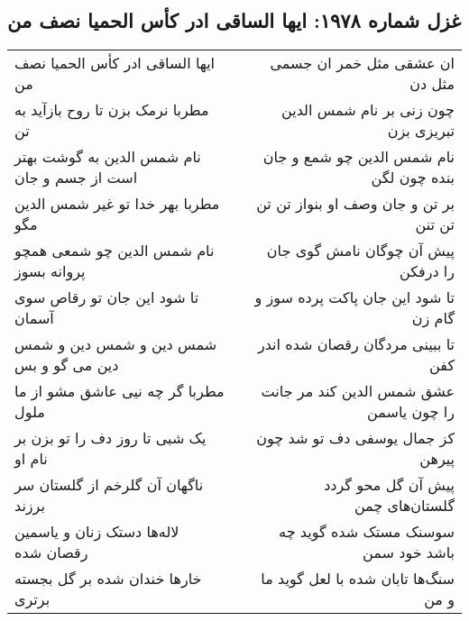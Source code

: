 \begin{center}
\section*{غزل شماره ۱۹۷۸: ایها الساقی ادر کأس الحمیا نصف من}
\label{sec:1978}
\begin{longtable}{l p{0.5cm} r}
ایها الساقی ادر کأس الحمیا نصف من
&&
ان عشقی مثل خمر ان جسمی مثل دن
\\
مطربا نرمک بزن تا روح بازآید به تن
&&
چون زنی بر نام شمس الدین تبریزی بزن
\\
نام شمس الدین به گوشت بهتر است از جسم و جان
&&
نام شمس الدین چو شمع و جان بنده چون لگن
\\
مطربا بهر خدا تو غیر شمس الدین مگو
&&
بر تن و جان وصف او بنواز تن تن تن تنن
\\
نام شمس الدین چو شمعی همچو پروانه بسوز
&&
پیش آن چوگان نامش گوی جان را درفکن
\\
تا شود این جان تو رقاص سوی آسمان
&&
تا شود این جان پاکت پرده سوز و گام زن
\\
شمس دین و شمس دین و شمس دین می گو و بس
&&
تا ببینی مردگان رقصان شده اندر کفن
\\
مطربا گر چه نیی عاشق مشو از ما ملول
&&
عشق شمس الدین کند مر جانت را چون یاسمن
\\
یک شبی تا روز دف را تو بزن بر نام او
&&
کز جمال یوسفی دف تو شد چون پیرهن
\\
ناگهان آن گلرخم از گلستان سر برزند
&&
پیش آن گل محو گردد گلستان‌های چمن
\\
لاله‌ها دستک زنان و یاسمین رقصان شده
&&
سوسنک مستک شده گوید چه باشد خود سمن
\\
خارها خندان شده بر گل بجسته برتری
&&
سنگ‌ها تابان شده با لعل گوید ما و من
\\
\end{longtable}
\end{center}
